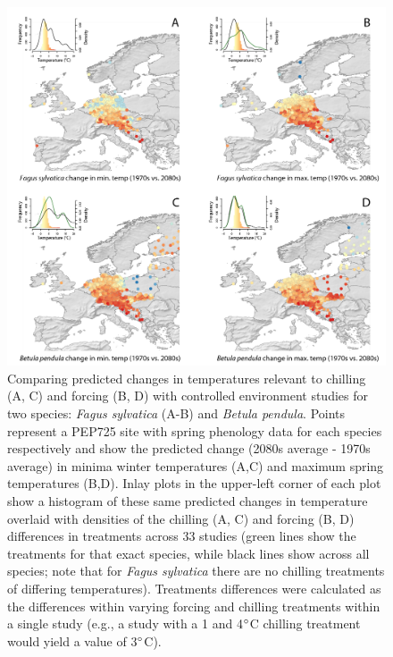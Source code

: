 \documentclass[11pt,letter]{article}
\begin{document}
\begin{figure}[t!]
\centering
\includegraphics[width=1\textwidth]{figures/Fig1_noblues_densities.png}
\caption{Comparing predicted changes in temperatures relevant to chilling (A, C) and forcing (B, D) with controlled environment studies for two species: \emph{Fagus sylvatica} (A-B) and \emph{Betula pendula}. Points represent a PEP725 site with spring phenology data for each species respectively and show the predicted change (2080s average - 1970s average) in minima winter temperatures (A,C) and maximum spring temperatures (B,D). Inlay plots in the upper-left  corner of each plot show a histogram of these same predicted changes in temperature overlaid with densities of the chilling (A, C) and forcing (B, D) differences in treatments across 33 studies (green lines show the treatments for that exact species, while black lines show across all species; note that for \emph{Fagus sylvatica} there are no chilling treatments of differing temperatures). Treatments differences were calculated as the differences within varying forcing and chilling treatments within a single study (e.g., a study with a 1 and 4$\degree$C chilling treatment would yield a value of 3$\degree$C). }
  \label{fig:pep}
\end{figure}
\end{document}
